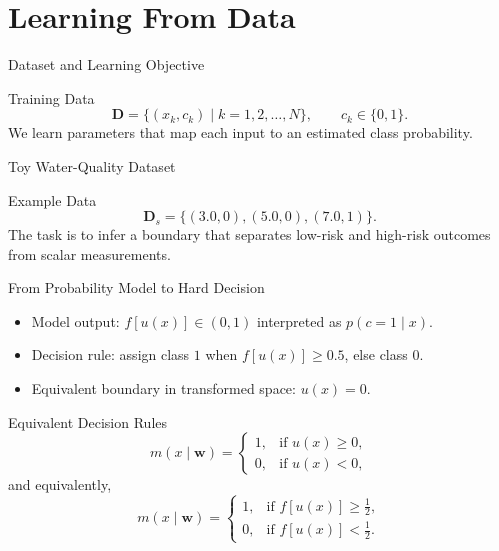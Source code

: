 \documentclass[10pt]{beamer}
\begin{document}
\section{Learning From Data}

\begin{frame}{Dataset and Learning Objective}
  \justifying
  \begin{conceptbox}{Training Data}
    \[
      \mathbf{D}=\{(x_k,c_k)\mid k=1,2,\ldots,N\},\qquad c_k\in\{0,1\}.
    \]
    We learn parameters that map each input to an estimated class probability.
  \end{conceptbox}
\end{frame}

\begin{frame}{Toy Water-Quality Dataset}
  \justifying
  \begin{examplebox}{Example Data}
    \[
      \mathbf{D}_s=\{(3.0,0),(5.0,0),(7.0,1)\}.
    \]
    The task is to infer a boundary that separates low-risk and high-risk outcomes from scalar measurements.
  \end{examplebox}
\end{frame}

\begin{frame}{From Probability Model to Hard Decision}
  \justifying
  \begin{itemize}
    \item Model output: $f[u(x)]\in(0,1)$ interpreted as $p(c=1\mid x)$.
    \item Decision rule: assign class $1$ when $f[u(x)]\geq 0.5$, else class $0$.
    \item Equivalent boundary in transformed space: $u(x)=0$.
  \end{itemize}
\end{frame}

\begin{frame}{Equivalent Decision Rules}
  \justifying
  \begin{equation*}
    m(x\mid\bm{w})=
    \begin{cases}
      1, & \text{if } u(x)\ge 0,\\
      0, & \text{if } u(x)<0,
    \end{cases}
  \end{equation*}
  and equivalently,
  \begin{equation*}
    m(x\mid\bm{w})=
    \begin{cases}
      1, & \text{if } f[u(x)]\ge \tfrac{1}{2},\\
      0, & \text{if } f[u(x)]< \tfrac{1}{2}.
    \end{cases}
  \end{equation*}
\end{frame}
\end{document}
